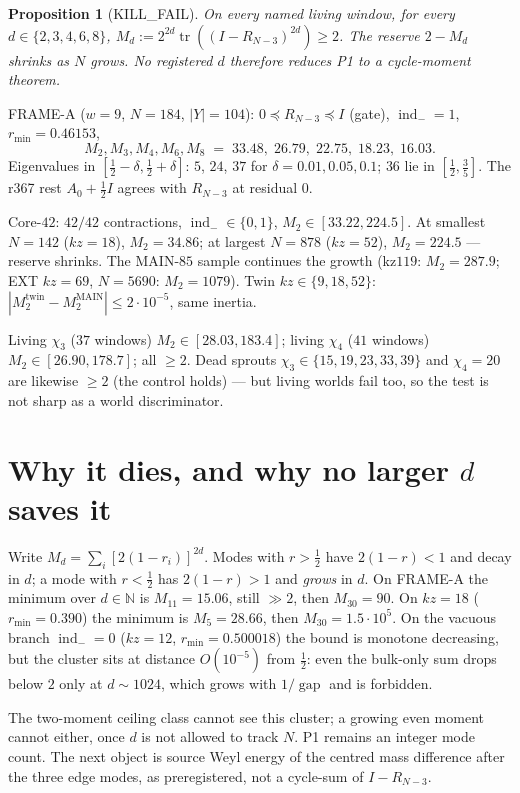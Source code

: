 \documentclass[11pt]{article}
\newtheorem{prop}{Proposition}
\theoremstyle{remark}
\newcommand{\indm}{\operatorname{ind}_{-}}
\newcommand{\half}{\tfrac12}
\newcommand{\tr}{\operatorname{tr}}
\begin{document}
\begin{prop}[KILL\_FAIL]\label{prop:fail}
On every named living window, for every
$d\in\{2,3,4,6,8\}$,
$M_d:=2^{2d}\tr((I-R_{N-3})^{2d})\ge 2$.
The reserve $2-M_d$ shrinks as $N$ grows.
No registered $d$ therefore reduces P1 to a cycle-moment
theorem.
\end{prop}

FRAME-A ($w=9$, $N=184$, $|Y|=104$): $0\preceq R_{N-3}\preceq I$
(gate), $\indm=1$, $r_{\min}=0.46153$,
\[
M_{2},M_{3},M_{4},M_{6},M_{8}
\;=\;
33.48,\;26.79,\;22.75,\;18.23,\;16.03.
\]
Eigenvalues in $[\half-\delta,\half+\delta]$:
$5$, $24$, $37$ for $\delta=0.01,0.05,0.1$;
$36$ lie in $[\half,\tfrac35]$.
The r367 rest $A_0+\half I$ agrees with $R_{N-3}$ at residual $0$.

Core-$42$: $42/42$ contractions, $\indm\in\{0,1\}$,
$M_2\in[33.22,224.5]$.
At smallest $N=142$ ($kz=18$), $M_2=34.86$;
at largest $N=878$ ($kz=52$), $M_2=224.5$ --- reserve shrinks.
The MAIN-$85$ sample continues the growth (kz$119$: $M_2=287.9$;
EXT $kz=69$, $N=5690$: $M_2=1079$).
Twin $kz\in\{9,18,52\}$: $|M_2^{\mathrm{twin}}-M_2^{\mathrm{MAIN}}|\le 2\cdot 10^{-5}$,
same inertia.

Living $\chi_3$ ($37$ windows) $M_2\in[28.03,183.4]$;
living $\chi_4$ ($41$ windows) $M_2\in[26.90,178.7]$;
all $\ge 2$.
Dead sprouts $\chi_3\in\{15,19,23,33,39\}$ and $\chi_4=20$ are
likewise $\ge 2$ (the control holds) --- but living worlds fail
too, so the test is not sharp as a world discriminator.

\section{Why it dies, and why no larger $d$ saves it}\label{sec:why}

Write $M_d=\sum_i[2(1-r_i)]^{2d}$.
Modes with $r>\half$ have $2(1-r)<1$ and decay in $d$;
a mode with $r<\half$ has $2(1-r)>1$ and \emph{grows} in $d$.
On FRAME-A the minimum over $d\in\mathbb{N}$ is $M_{11}=15.06$,
still $\gg 2$, then $M_{30}=90$.
On $kz=18$ ($r_{\min}=0.390$) the minimum is $M_5=28.66$, then
$M_{30}=1.5\cdot 10^{5}$.
On the vacuous branch $\indm=0$ ($kz=12$, $r_{\min}=0.500018$)
the bound is monotone decreasing, but the cluster sits at
distance $O(10^{-5})$ from $\half$: even the bulk-only sum
drops below $2$ only at $d\sim 1024$, which grows with
$1/\operatorname{gap}$ and is forbidden.

The two-moment ceiling class cannot see this cluster; a
growing even moment cannot either, once $d$ is not allowed
to track $N$.
P1 remains an integer mode count.
The next object is source Weyl energy of the centred mass
difference after the three edge modes, as preregistered, not
a cycle-sum of $I-R_{N-3}$.
\end{document}
